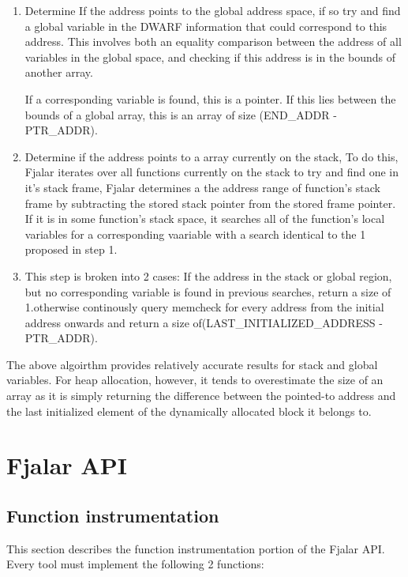 \documentclass{article}
\begin{document}
\begin{enumerate}

\item Determine If the address points to the global address space, if so
   try and find a global variable in the DWARF information that could
   correspond to this address. This involves both an equality comparison
   between the address of all variables in the global space, and checking
   if this address is in the bounds of another array.
   
   If a corresponding variable is found, this is a pointer. If this lies
   between the bounds of a global array, this is an array of size
   (END\_ADDR - PTR\_ADDR). 

\item Determine if the address points to a array currently on the stack,
   To do this, Fjalar iterates over all functions currently on the
   stack to try and find one in it's stack frame, Fjalar determines a
   the address range of function's stack frame by subtracting the
   stored stack pointer from the stored frame pointer. If it is in
   some function's stack space, it searches all of the function's
   local variables for a corresponding vaariable with a search
   identical to the 1 proposed in step 1.

\item This step is broken into 2 cases: If the address in the stack or
  global region, but no corresponding variable is found in previous
  searches, return a size of 1.otherwise continously query memcheck
  for every address from the initial address onwards and return a size
  of(LAST\_INITIALIZED\_ADDRESS - PTR\_ADDR).

\end{enumerate} 
The above algoirthm provides relatively accurate results for stack and
global variables. For heap allocation, however, it tends to
overestimate the size of an array as it is simply returning the
difference between the pointed-to address and the last initialized
element of the dynamically allocated block it belongs to.

\section{Fjalar API}

\subsection{Function instrumentation}
This section describes the function instrumentation portion of the
Fjalar API. Every tool must implement the following 2 functions:
\end{document}

